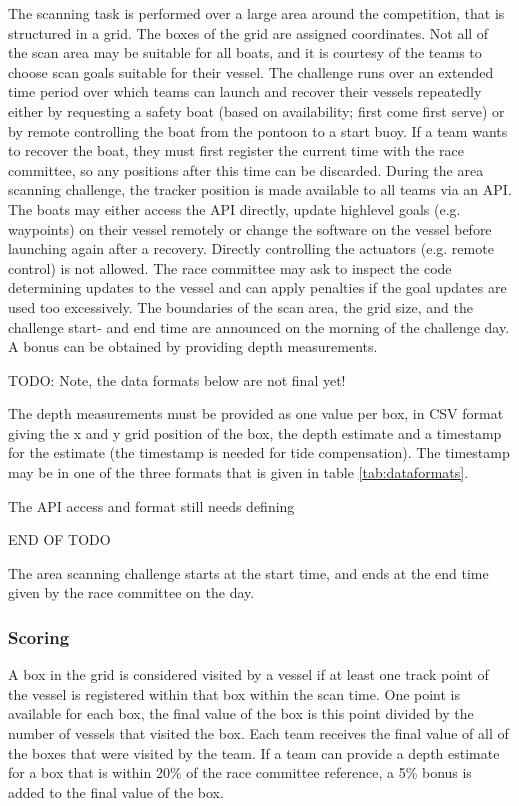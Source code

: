 \documentclass[12pt]{article}
\begin{document}
The scanning task is performed over a large area around the competition, that is
structured in a grid. The boxes of the grid are assigned coordinates. Not all of
the scan area may be suitable for all boats, and it is courtesy of the teams to
choose scan goals suitable for their vessel. The
challenge runs over an extended time period over which teams can launch and
recover their vessels repeatedly either by requesting a safety boat (based on
availability; first come first serve) or by remote controlling the boat from the
pontoon to a start buoy. If a team wants to recover the boat, they must first
register the current time with the race committee, so any positions after this
time can be discarded.
During the area scanning challenge, the tracker position is made available 
to all teams via an API. The boats may either access the API directly, update
highlevel goals (e.g. waypoints) on their vessel remotely or change the software
on the vessel before launching again after a recovery. Directly controlling the
actuators (e.g. remote control) is not allowed. The race committee may ask to
inspect the code determining updates to the vessel and can apply penalties if
the goal updates are used too excessively.
The boundaries of the scan area, the grid size, and the challenge start- and end time
are announced on the morning of the challenge day.
A bonus can be obtained by providing depth measurements.

TODO: Note, the data formats below are not final yet!

The depth measurements
must be provided as one value per box, in CSV format giving the x and y grid
position of the box, the depth estimate and a timestamp for the estimate (the
timestamp is needed for tide compensation). The timestamp may be in one of the
three formats that is given in table \ref{tab:dataformats}. 

The API access and format still needs defining

END OF TODO

The area scanning challenge starts at the start time, and ends at the end
time given by the race committee on the day.

\subsubsection{Scoring}

A box in the grid is considered visited by a vessel if at least one track point
of the vessel is registered within that box within the scan time.
One point is available for each box, the final value of the box is this point 
divided by the number of vessels that visited the box. 
Each team receives the final value of all of the boxes that were visited by the
team. If a team can provide a depth estimate for a box that is within 20\% of
the race committee reference, a 5\% bonus is added to 
the final value of the box.
\end{document}
